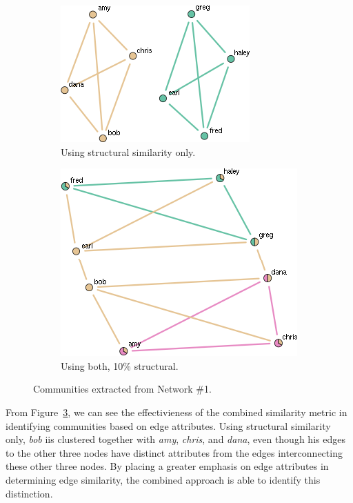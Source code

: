 \documentclass{report} %
\begin{document}
\begin{figure}[htp!]
  \centering
  \begin{subfigure}{.5\textwidth}
    \centering
    \includegraphics[width=.8\linewidth]{toy2/no_ea/edge_comm.png}
    \caption{Using structural similarity only.}
    \label{fig:net1_comm_struct}
  \end{subfigure}%
  \begin{subfigure}{.5\textwidth}
    \centering
    \includegraphics[width=.9\linewidth]{toy2/ea/edge_comm_0.1.png}
    \caption{Using both, 10\% structural.}
    \label{fig:net1_comm_both_10}
  \end{subfigure}
  \caption{Communities extracted from Network \#1.}
  \label{fig:net1_comm}
\end{figure}

From Figure~\ref{fig:net1_comm}, we can see the effectivieness of the combined similarity metric in identifying communities based on edge attributes. Using structural similarity only, \textit{bob} iis clustered together with \textit{amy}, \textit{chris}, and \textit{dana}, even though his edges to the other three nodes have distinct attributes from the edges interconnecting these other three nodes. By placing a greater emphasis on edge attributes in determining edge similarity, the combined approach is able to identify this distinction.\\
\end{document}
